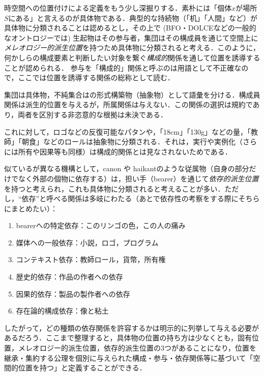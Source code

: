 \documentclass[../../main-detail.tex]{subfiles}
\begin{document}
時空間への位置付けによる定義をもう少し深掘りする．素朴には「個体$x$が場所$S$にある」と言えるのが具体物である．典型的な持続物（「机」「人間」など）が具体物に分類されることは認めるとし，その上で (BFO・DOLCEなどの一般的なオントロジーでは) 生起物はその参与者，集団はその構成員を通じて空間上に\emph{メレオロジー的派生位置}を持つため具体物に分類されると考える．このように，何かしらの構成要素と判断したい対象を繋ぐ\emph{構成的}関係を通して位置を誘導することが認められる．
参与を「構成的」関係と呼ぶのは用語として不正確なので，ここでは位置を誘導する関係の総称として読む．
\begin{remark}
集団は具体物，不純集合はの形式構築物（抽象物）として語彙を分ける．構成員関係は派生的位置を与えるが，所属関係は与えない．この関係の選択は規約であり，両者を区別する非恣意的な根拠は未決である．
\end{remark}

これに対して，ロゴなどの反復可能なパタンや，「18cm」「130g」などの量，「教師」「朝食」などのロールは抽象物に分類される．それは，実行や実例化（さらには所有や因果等も同様）は構成的関係とは見なされないためである．

似ているが異なる機構として，canon や haikantのような従属物（自身の部分だけでなく外部の個物に依存する）は，担い手（bearer）を通じて\emph{依存的派生位置}を持つと考えられ，これも具体物に分類されると考えることが多い．ただし，``依存''と呼べる関係は多岐にわたる（あとで依存性の考察をする際にそちらにまとめたい）：
\begin{enumerate}
    \item bearerへの特定依存：このリンゴの色，この人の痛み
    \item 媒体への一般依存：小説，ロゴ，プログラム
    \item コンテキスト依存：教師ロール，貨幣，所有権
    \item 歴史的依存：作品の作者への依存
    \item 因果的依存：製品の製作者への依存
    \item 存在論的構成依存：像と粘土
\end{enumerate}
したがって，どの種類の依存関係を許容するかは明示的に列挙して与える必要があるだろう．ここまで整理すると，具体物の位置の持ち方は少なくとも，固有位置，メレオロジー的派生位置，依存的派生位置の3つがあることになり，位置を継承・集約する公理を個別に与えられた構成・参与・依存関係等に基づいて「空間的位置を持つ」と定義することができる．
\end{document}
